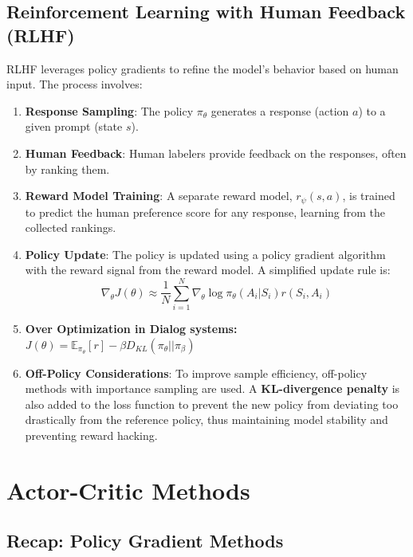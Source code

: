 \documentclass[12pt]{article}
\begin{document}
\subsection{Reinforcement Learning with Human Feedback (RLHF)}
RLHF leverages policy gradients to refine the model's behavior based on human input. The process involves:
\begin{enumerate}
    \item \textbf{Response Sampling}: The policy $\pi_\theta$ generates a response (action $a$) to a given prompt (state $s$).
    \item \textbf{Human Feedback}: Human labelers provide feedback on the responses, often by ranking them.
    \item \textbf{Reward Model Training}: A separate reward model, $r_\psi(s,a)$, is trained to predict the human preference score for any response, learning from the collected rankings.
    \item \textbf{Policy Update}: The policy is updated using a policy gradient algorithm with the reward signal from the reward model. A simplified update rule is:
    $$ \nabla_\theta J(\theta) \approx \frac{1}{N} \sum_{i=1}^N \nabla_\theta \log \pi_\theta(A_i | S_i) r(S_i, A_i) $$

    \item \textbf{Over Optimization in Dialog systems:}
    $J(\theta) = \mathbb{E}_{\pi_{\theta}}[r] - \beta D_{KL}(\pi_{\theta}||\pi_{\beta})$
    
    \item \textbf{Off-Policy Considerations}: To improve sample efficiency, off-policy methods with importance sampling are used. A \textbf{KL-divergence penalty} is also added to the loss function to prevent the new policy from deviating too drastically from the reference policy, thus maintaining model stability and preventing reward hacking.
\end{enumerate}

\section{Actor-Critic Methods }

\subsection{Recap: Policy Gradient Methods}
\end{document}
